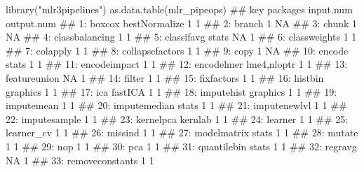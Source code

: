 \documentclass[]{article}
\newenvironment{Shaded}{}{}
\newcommand{\KeywordTok}[1]{\textcolor[rgb]{0.00,0.00,1.00}{#1}}
\newcommand{\NormalTok}[1]{#1}
\newcommand{\StringTok}[1]{\textcolor[rgb]{0.00,0.50,0.50}{#1}}
\renewenvironment{Shaded} {\begin{snugshade}\small} {\end{snugshade}}
\begin{document}
\begin{Shaded}
\begin{Highlighting}[]
\KeywordTok{library}\NormalTok{(}\StringTok{"mlr3pipelines"}\NormalTok{)}
\KeywordTok{as.data.table}\NormalTok{(mlr_pipeops)}
\NormalTok{##                 key      packages input.num output.num}
\NormalTok{##  1:          boxcox bestNormalize         1          1}
\NormalTok{##  2:          branch                       1         NA}
\NormalTok{##  3:           chunk                       1         NA}
\NormalTok{##  4:  classbalancing                       1          1}
\NormalTok{##  5:      classifavg         stats        NA          1}
\NormalTok{##  6:    classweights                       1          1}
\NormalTok{##  7:        colapply                       1          1}
\NormalTok{##  8: collapsefactors                       1          1}
\NormalTok{##  9:            copy                       1         NA}
\NormalTok{## 10:          encode         stats         1          1}
\NormalTok{## 11:    encodeimpact                       1          1}
\NormalTok{## 12:      encodelmer   lme4,nloptr         1          1}
\NormalTok{## 13:    featureunion                      NA          1}
\NormalTok{## 14:          filter                       1          1}
\NormalTok{## 15:      fixfactors                       1          1}
\NormalTok{## 16:         histbin      graphics         1          1}
\NormalTok{## 17:             ica       fastICA         1          1}
\NormalTok{## 18:      imputehist      graphics         1          1}
\NormalTok{## 19:      imputemean                       1          1}
\NormalTok{## 20:    imputemedian         stats         1          1}
\NormalTok{## 21:    imputenewlvl                       1          1}
\NormalTok{## 22:    imputesample                       1          1}
\NormalTok{## 23:       kernelpca       kernlab         1          1}
\NormalTok{## 24:         learner                       1          1}
\NormalTok{## 25:      learner_cv                       1          1}
\NormalTok{## 26:         missind                       1          1}
\NormalTok{## 27:     modelmatrix         stats         1          1}
\NormalTok{## 28:          mutate                       1          1}
\NormalTok{## 29:             nop                       1          1}
\NormalTok{## 30:             pca                       1          1}
\NormalTok{## 31:     quantilebin         stats         1          1}
\NormalTok{## 32:         regravg                      NA          1}
\NormalTok{## 33: removeconstants                       1          1}

\end{Highlighting}
\end{Shaded}
\end{document}
